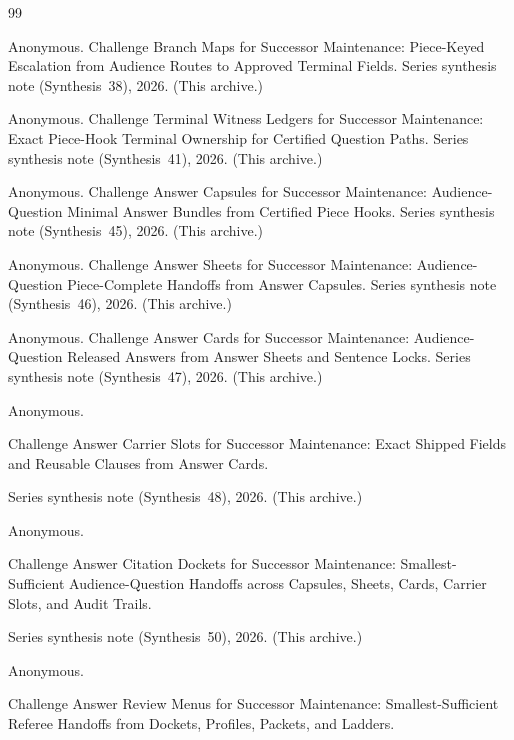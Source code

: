\documentclass[11pt]{article}
\begin{document}
\begin{thebibliography}{99}\small

Anonymous.
\newblock Challenge Branch Maps for Successor Maintenance: Piece-Keyed Escalation from Audience Routes to Approved Terminal Fields.
\newblock Series synthesis note (Synthesis~38), 2026. (This archive.)

Anonymous.
\newblock Challenge Terminal Witness Ledgers for Successor Maintenance: Exact Piece-Hook Terminal Ownership for Certified Question Paths.
\newblock Series synthesis note (Synthesis~41), 2026. (This archive.)

Anonymous.
\newblock Challenge Answer Capsules for Successor Maintenance: Audience-Question Minimal Answer Bundles from Certified Piece Hooks.
\newblock Series synthesis note (Synthesis~45), 2026. (This archive.)

Anonymous.
\newblock Challenge Answer Sheets for Successor Maintenance: Audience-Question Piece-Complete Handoffs from Answer Capsules.
\newblock Series synthesis note (Synthesis~46), 2026. (This archive.)

Anonymous.
\newblock Challenge Answer Cards for Successor Maintenance: Audience-Question Released Answers from Answer Sheets and Sentence Locks.
\newblock Series synthesis note (Synthesis~47), 2026. (This archive.)

Anonymous.

\newblock Challenge Answer Carrier Slots for Successor Maintenance: Exact Shipped Fields and Reusable Clauses from Answer Cards.

\newblock Series synthesis note (Synthesis~48), 2026. (This archive.)

Anonymous.

\newblock Challenge Answer Citation Dockets for Successor Maintenance: Smallest-Sufficient Audience-Question Handoffs across Capsules, Sheets, Cards, Carrier Slots, and Audit Trails.

\newblock Series synthesis note (Synthesis~50), 2026. (This archive.)

Anonymous.

\newblock Challenge Answer Review Menus for Successor Maintenance: Smallest-Sufficient Referee Handoffs from Dockets, Profiles, Packets, and Ladders.


\end{thebibliography}
\end{document}
